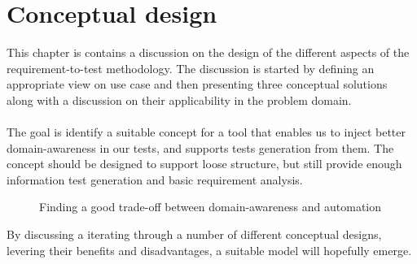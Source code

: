 \chapter{Conceptual design}
\label{chap:conceptual_design}
This chapter is contains a discussion on the design of the different aspects of the requirement-to-test methodology. The discussion is started by defining an appropriate view on use case and then presenting three conceptual solutions along with a discussion on their applicability in the problem domain.\\\\
The goal is identify a suitable concept for a tool that enables us to inject better domain-awareness in our tests, and supports tests generation from them.
The concept should be designed to support loose structure, but still provide enough information test generation and basic requirement analysis.
\begin{figure}[!htbp]
\centering

\caption{Finding a good trade-off between domain-awareness and automation}
\label{fig:project_parameter_plot_project}
\end{figure}By discussing a iterating through a number of different conceptual designs, levering their benefits and disadvantages, a suitable model will hopefully emerge.


